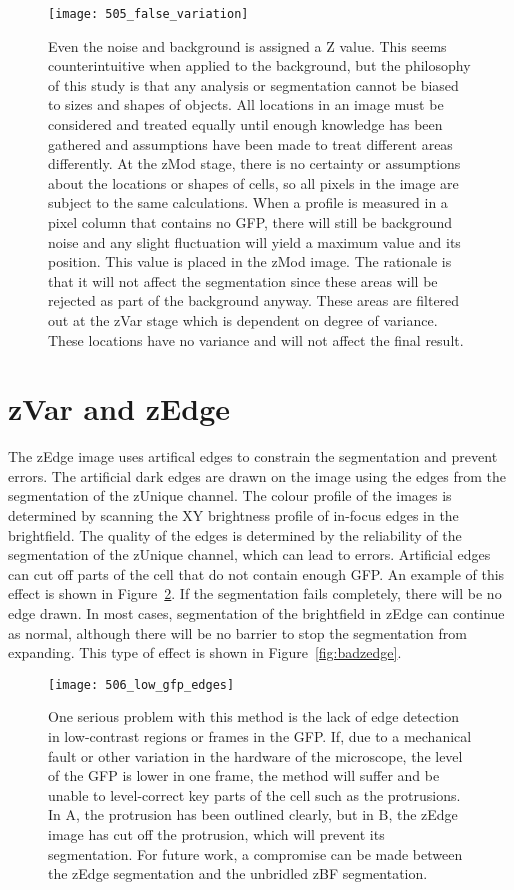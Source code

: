 \begin{figure}[h!]
 \centering
 \texttt{[image: 505\_false\_variation]}
 \caption[False Z variation]{
 	Even the noise and background is assigned a Z value. This seems counterintuitive when applied to the background, but the philosophy of this study is that any analysis or segmentation cannot be biased to sizes and shapes of objects. All locations in an image must be considered and treated equally until enough knowledge has been gathered and assumptions have been made to treat different areas differently. At the zMod stage, there is no certainty or assumptions about the locations or shapes of cells, so all pixels in the image are subject to the same calculations. When a profile is measured in a pixel column that contains no GFP, there will still be background noise and any slight fluctuation will yield a maximum value and its position. This value is placed in the zMod image. The rationale is that it will not affect the segmentation since these areas will be rejected as part of the background anyway. These areas are filtered out at the zVar stage which is dependent on degree of variance. These locations have no variance and will not affect the final result.
 }
 \label{fig:falsezvariation}
\end{figure}

\section{zVar and zEdge}

The zEdge image uses artifical edges to constrain the segmentation and prevent errors. The artificial dark edges are drawn on the image using the edges from the segmentation of the zUnique channel. The colour profile of the images is determined by scanning the XY brightness profile of in-focus edges in the brightfield. The quality of the edges is determined by the reliability of the segmentation of the zUnique channel, which can lead to errors. Artificial edges can cut off parts of the cell that do not contain enough GFP. An example of this effect is shown in Figure~\ref{fig:lowgfp}. If the segmentation fails completely, there will be no edge drawn. In most cases, segmentation of the brightfield in zEdge can continue as normal, although there will be no barrier to stop the segmentation from expanding. This type of effect is shown in Figure~\ref{fig:badzedge}.

\begin{figure}[h!]
 \centering
 \texttt{[image: 506\_low\_gfp\_edges]}
 \caption[Edges in low GFP regions]{
 	One serious problem with this method is the lack of edge detection in low-contrast regions or frames in the GFP. If, due to a mechanical fault or other variation in the hardware of the microscope, the level of the GFP is lower in one frame, the method will suffer and be unable to level-correct key parts of the cell such as the protrusions. In A, the protrusion has been outlined clearly, but in B, the zEdge image has cut off the protrusion, which will prevent its segmentation. For future work, a compromise can be made between the zEdge segmentation and the unbridled zBF segmentation.
 }
 \label{fig:lowgfp}
\end{figure}

